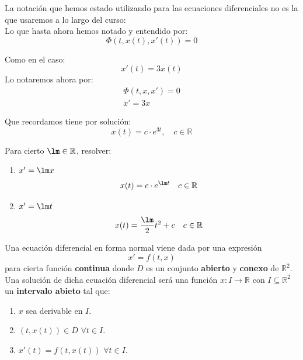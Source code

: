 \begin{notacion}
    La notación que hemos estado utilizando para las ecuaciones diferenciales no es la que usaremos a lo largo del curso:\\

    Lo que hasta ahora hemos notado y entendido por:
    \begin{equation*}
        \Phi(t,x(t),x'(t)) = 0
    \end{equation*}

    Como en el caso:
    \begin{equation*}
      x'(t) = 3x(t)  
    \end{equation*}
    Lo notaremos ahora por:
    \begin{gather*}
        \Phi(t,x,x') = 0\\
        x' = 3x
    \end{gather*}

    Que recordamos tiene por solución:
    \begin{equation*}
        x(t) = c \cdot e^{3t}, \quad c \in \mathbb{R}
    \end{equation*}
\end{notacion}

\begin{ejemplo}
    Para cierto $\lm \in \mathbb{R}$, resolver:
    \begin{enumerate}
        \item $x' = \lm x$
            \begin{equation*}
                x(t) = c \cdot e^{\lm t} \quad c \in \mathbb{R}
            \end{equation*}
        \item $x' = \lm t$
            \begin{equation*}
                x(t) = \frac{\lm}{2} t^2 + c \quad c \in \mathbb{R}
            \end{equation*}
    \end{enumerate}
\end{ejemplo}

\begin{definicion}
    Una ecuación diferencial en forma normal viene dada por una expresión
    \begin{equation*}
        x' = f(t,x)
    \end{equation*}
    para cierta función
    \textbf{continua} donde $D$ es un conjunto \textbf{abierto} y \textbf{conexo} de $\mathbb{R}^2$.\newline
    Una solución de dicha ecuación diferencial será una función $x:I\rightarrow\mathbb{R}$ con $I\subseteq\mathbb{R}^2$ un \textbf{intervalo abieto} tal que:
    \begin{enumerate}[label=(\roman*)]
        \item $x$ sea derivable en $I$.
        \item $(t,x(t))\in D$ $\forall t\in I$.
        \item $x'(t) = f(t,x(t))$ $\forall t\in I$.
    \end{enumerate}
\end{definicion}

